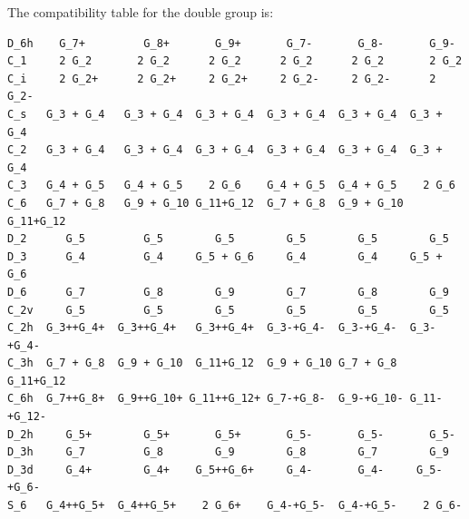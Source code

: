 \documentclass[12pt,a4paper]{article}
\begin{document}
The compatibility table for the double group is:
\begin{verbatim}
D_6h    G_7+         G_8+       G_9+       G_7-       G_8-       G_9-
C_1     2 G_2       2 G_2      2 G_2      2 G_2      2 G_2       2 G_2
C_i     2 G_2+      2 G_2+     2 G_2+     2 G_2-     2 G_2-      2 G_2-
C_s   G_3 + G_4   G_3 + G_4  G_3 + G_4  G_3 + G_4  G_3 + G_4  G_3 + G_4
C_2   G_3 + G_4   G_3 + G_4  G_3 + G_4  G_3 + G_4  G_3 + G_4  G_3 + G_4
C_3   G_4 + G_5   G_4 + G_5    2 G_6    G_4 + G_5  G_4 + G_5    2 G_6
C_6   G_7 + G_8   G_9 + G_10 G_11+G_12  G_7 + G_8  G_9 + G_10 G_11+G_12
D_2      G_5         G_5        G_5        G_5        G_5        G_5
D_3      G_4         G_4     G_5 + G_6     G_4        G_4     G_5 + G_6    
D_6      G_7         G_8        G_9        G_7        G_8        G_9
C_2v     G_5         G_5        G_5        G_5        G_5        G_5
C_2h  G_3++G_4+  G_3++G_4+   G_3++G_4+  G_3-+G_4-  G_3-+G_4-  G_3-+G_4- 
C_3h  G_7 + G_8  G_9 + G_10  G_11+G_12  G_9 + G_10 G_7 + G_8  G_11+G_12
C_6h  G_7++G_8+  G_9++G_10+ G_11++G_12+ G_7-+G_8-  G_9-+G_10- G_11-+G_12-
D_2h     G_5+        G_5+       G_5+       G_5-       G_5-       G_5-
D_3h     G_7         G_8        G_9        G_8        G_7        G_9
D_3d     G_4+        G_4+    G_5++G_6+     G_4-       G_4-     G_5-+G_6-
S_6   G_4++G_5+  G_4++G_5+    2 G_6+    G_4-+G_5-  G_4-+G_5-    2 G_6-
\end{verbatim}
\end{document}
